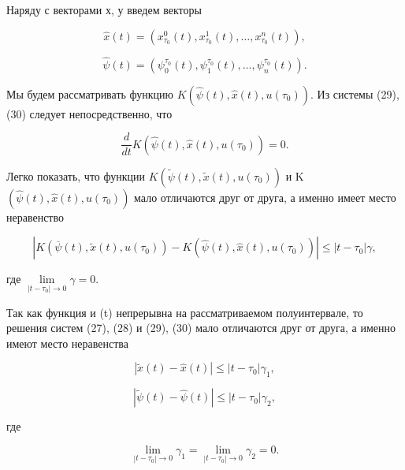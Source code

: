 \documentclass[10pt]{article}
\begin{document}
Наряду с векторами х, у введем векторы

\[
\widehat{x}\left( t\right)  = \left( {{x}_{{\tau }_{0}}^{0}\left( t\right),{x}_{{\tau }_{0}}^{1}\left( t\right),\ldots,{x}_{{\tau }_{0}}^{n}\left( t\right) }\right),
\]

\[
\widehat{\psi }\left( t\right)  = \left( {{\psi }_{0}^{{\tau }_{0}}\left( t\right),{\psi }_{1}^{{\tau }_{0}}\left( t\right),\ldots,{\psi }_{n}^{{\tau }_{0}}\left( t\right) }\right).
\]

Мы будем рассматривать функцию \(K\left( {\widehat{\psi }\left( t\right),\widehat{x}\left( t\right),u\left( {\tau }_{0}\right) }\right)\). Из системы (29),(30) следует непосредственно, что

\[
\frac{d}{dt}K\left( {\widehat{\psi }\left( t\right),\widehat{x}\left( t\right),u\left( {\tau }_{0}\right) }\right)  = 0.
\]

Легко показать, что функции \(K\left( {\widetilde{\psi }\left( t\right),\widetilde{x}\left( t\right),u\left( {\tau }_{0}\right) }\right)\) и K \(\left( {\widehat{\psi }\left( t\right),\widehat{x}\left( t\right),u\left( {\tau }_{0}\right) }\right)\) мало отличаются друг от друга, а именно имеет место неравенство

\[
\left| {K\left( {\overline{\psi }\left( t\right),\widetilde{x}\left( t\right),u\left( {\tau }_{0}\right) }\right)  - K\left( {\widehat{\psi }\left( t\right),\widehat{x}\left( t\right),u\left( {\tau }_{0}\right) }\right) }\right|  \leq  \left| {t - {\tau }_{0}}\right| \gamma, \tag{31}
\]

где \(\mathop{\lim }\limits_{{\left| {t - {\tau }_{0}}\right|  \rightarrow  0}}\gamma  = 0\).

Так как функция и (t) непрерывна на рассматриваемом полуинтервале, то решения систем (27), (28) и (29), (30) мало отличаются друг от друга, а именно имеют место неравенства

\[
\left| {\widetilde{x}\left( t\right)  - \widehat{x}\left( t\right) }\right|  \leq  \left| {t - {\tau }_{0}}\right| {\gamma }_{1}, \tag{32}
\]

\[
\left| {\widetilde{\psi }\left( t\right)  - \widehat{\psi }\left( t\right) }\right|  \leq  \left| {t - {\tau }_{0}}\right| {\gamma }_{2}, \tag{33}
\]

где

\[
\mathop{\lim }\limits_{{\left| {t - {\tau }_{0}}\right|  \rightarrow  0}}{\gamma }_{1} = \mathop{\lim }\limits_{{\left| {t - {\tau }_{0}}\right|  \rightarrow  0}}{\gamma }_{2} = 0.
\]
\end{document}
